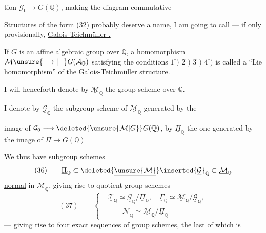 tion $\mathcal{G}_0\longrightarrow G(\mathbb{Q})$, making  the diagram commutative

Structures of the form (32) probably deserve a name, I am going to call  --- if only provisionally, \uline{Galois-Teichmüller .}

If $G$ is an affine algebraic group over $\mathbb{Q}$, a homomorphism $\mathcal{M}\unsure{\longrightarrow|{-}}G(\mathcal{A}_{\mathbb{Q}})$ satisfying the conditions $1^{\circ})$ $2^{\circ})$ $3^{\circ})$  $4^{\circ})$ is called a ``Lie homomorphism'' of the Galois-Teichmüller structure.

I will henceforth denote by $\underline{\mathcal{M}}_{\mathbb{Q}}$  the group scheme  over $\mathbb{Q}$. 

I denote by  $\underline{\mathcal{G}}_{\mathbb{Q}}$ the subgroup scheme of $\underline{\mathcal{M}}_{\mathbb{Q}}$ generated by the


image of $\mathcal{G}_0\longrightarrow\deleted{\unsure{\mathcal{M}|G}}G(\mathbb{Q})$, by $\underline{\Pi}_{\mathbb{Q}}$ the one generated by the image of $\Pi\longrightarrow G(\mathbb{Q})$

We thus have  subgroup schemes
\[
(36)\qquad \underline{\Pi}_{\mathbb{Q}}\subset
\deleted{\underline{\unsure{\mathcal{M}}}}\inserted{\underline{\mathcal{G}}}_{\mathbb{Q}}
\subset\underline{\mathcal{M}}_{\mathbb{Q}}
\]
\uline{normal} in $\underline{\mathcal{M}}_{\mathbb{Q}}$, giving rise to quotient group schemes
\[
(37)\qquad
\left\{
\begin{aligned}
&\underline{\mathcal{T}}_{\mathbb{Q}}\simeq
\underline{\mathcal{G}}_{\mathbb{Q}}/\underline{\Pi}_{\mathbb{Q}},\quad
\underline{\Gamma}_{\mathbb{Q}}\simeq
\underline{\mathcal{M}}_{\mathbb{Q}}/\underline{\mathcal{G}}_{\mathbb{Q}},\\
&\qquad\underline{\mathcal{N}}_{\mathbb{Q}}\simeq
\underline{\mathcal{M}}_{\mathbb{Q}}/\underline{\Pi}_{\mathbb{Q}}
\end{aligned}
\right.
\]
--- giving rise to four exact sequences of group schemes, the last of which is

